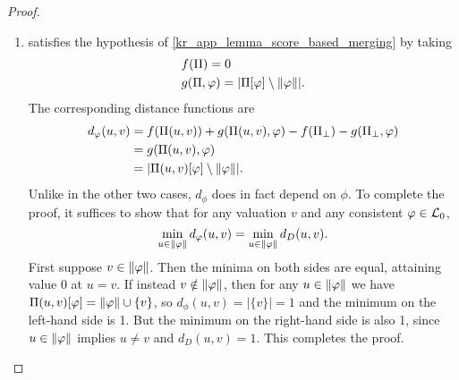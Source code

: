 \begin{proof}
\begin{enumerate}
          \item \scorebasedop{} satisfies the hypothesis of
              \cref{kr_app_lemma_score_based_merging} by taking
              \begin{align*}
                  &f(\Pi) = 0 \\
                  &g(\Pi, \varphi) = |\Pi[\varphi] \setminus \|{\varphi}\||.
              \end{align*}
              The corresponding distance functions are
              \begin{align*}
                  d_{\varphi}(u, v)
                  &= f(\Pi(u, v)) + g(\Pi(u, v), \varphi)
                    - f(\Pi_\bot) - g(\Pi_\bot, \varphi) \\
                  &= g(\Pi(u, v), \varphi) \\
                  &= |\Pi(u, v)[\varphi] \setminus \|{\varphi}\||.
              \end{align*}
              Unlike in the other two cases, $d_\phi$ does in fact depend on
              $\phi$. To complete the proof, it suffices to show that for any
              valuation $v$ and any consistent $\varphi \in \mathcal{L}{}_0$,
              \[
                  \min_{u \in \|{\varphi}\|}{d_{\varphi}(u, v)}
                  =
                  \min_{u \in \|{\varphi}\|}{d_D(u, v)}.
              \]
              First suppose $v \in \|{\varphi}\|$. Then the minima on both
              sides are equal, attaining value 0 at $u = v$.
              If instead $v \notin \|{\varphi}\|$, then for any $u \in
              \|{\varphi}\|$ we have $\Pi(u, v)[\varphi] = \|{\varphi}\| \cup
              \{v\}$, so $d_\phi(u, v) = |\{v\}| = 1$ and the minimum on the
              left-hand side is 1. But the minimum on the right-hand side is
              also 1, since $u \in \|{\varphi}\|$ implies $u \ne v$ and
              $d_D(u, v) = 1$. This completes the proof.
    \end{enumerate}
\end{proof}
